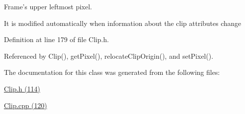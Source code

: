 Frame's upper leftmost pixel. 

It is modified automatically when information about the clip attributes change 

Definition at line 179 of file Clip.h.

Referenced by Clip(), getPixel(), relocateClipOrigin(), and setPixel().

The documentation for this class was generated from the following files:\begin{CompactItemize}
\item 
\hyperlink{_clip_8h}{Clip.h (114)}\item 
\hyperlink{_clip_8cpp}{Clip.cpp (120)}\end{CompactItemize}
